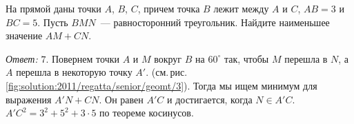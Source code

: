 На прямой даны точки $A$, $B$, $C$, причем точка $B$ лежит между $A$ и $C$, $AB = 3$ и $BC = 5$.
Пусть $BMN$~--- равносторонний треугольник.
Найдите наименьшее значение $AM + CN$.


%
\label{solution:2011/regatta/senior/geomt/3}%
\emph{Ответ:} $7$.
Повернем точки $A$ и $M$ вокруг $B$ на $60^\circ$ так, чтобы $M$ перешла в $N$,
а $A$ перешла в некоторую точку $A'$.
(см.\,рис.\,\ref{fig:solution:2011/regatta/senior/geomt/3}).
Тогда мы ищем минимум для выражения $A'N + CN$.
Он равен $A'C$ и достигается, когда $N \in A'C$.
$A'C^2 = 3^2 + 5^2 + 3 \cdot 5$ по теореме косинусов.


